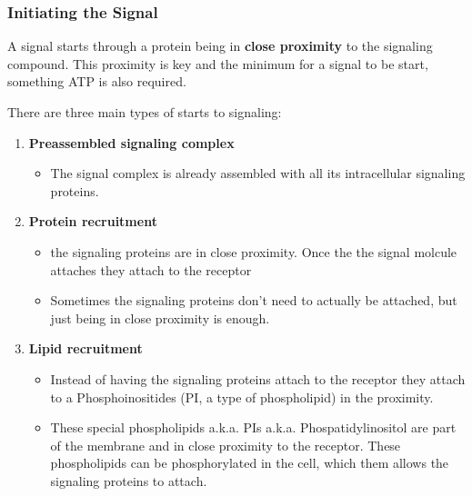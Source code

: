 \documentclass[../main.tex]{subfiles}
\begin{document}
\subsubsection{Initiating the Signal}

A signal starts through a protein being in \textbf{close proximity} to the signaling compound. This proximity is key and the minimum for a signal to be start, something ATP is also required.

There are three main types of starts to signaling:
\begin{enumerate}
	\item \textbf{Preassembled signaling complex}
	\begin{itemize}
		\item The signal complex is already assembled with all its intracellular signaling proteins.
	\end{itemize}
	\item\textbf{ Protein recruitment}
	\begin{itemize}
		\item the signaling proteins are in close proximity. Once the the signal molcule attaches they attach to the receptor
		\item Sometimes the signaling proteins don't need to actually be attached, but just being in close proximity is enough.
	\end{itemize}
	\item \textbf{Lipid recruitment}
	\begin{itemize}
		\item Instead of having the signaling proteins attach to the receptor they attach to a Phosphoinositides (PI, a type of phospholipid) in the proximity.
		\item These special phospholipids a.k.a. PIs a.k.a. Phospatidylinositol are part of the membrane and in close proximity to the receptor. These phospholipids can be phosphorylated in the cell, which them allows the signaling proteins to attach.
	\end{itemize}
\end{enumerate}
\end{document}
